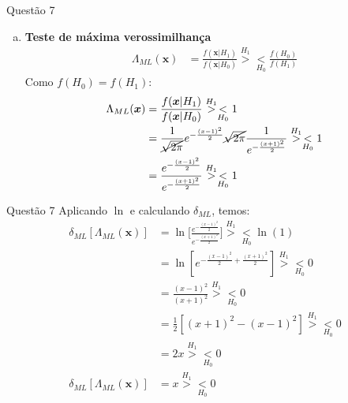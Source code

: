\documentclass{beamer}\usepackage[]{graphicx}\usepackage[]{color}
\begin{document}
		\begin{frame}{Questão 7}
			\begin{enumerate}[a)]
				\item \textbf{Teste de máxima verossimilhança}\\
					\begin{align*}
						\Lambda_{ML}(\boldsymbol{x}) &= \frac{f(\boldsymbol{x}|H_{1})}{f(\boldsymbol{x}|H_{0})} \overset{H_{1}}{>} \underset{H_{0}}{<} \frac{f(H_{0})}{f(H_{1})}
					\end{align*}
					Como $f(H_{0}) = f(H_{1})$:
					\begin{align*}
						\Lambda_{ML}(\boldsymbol{x}) &= \frac{f(\boldsymbol{x}|H_{1})}{f(\boldsymbol{x}|H_{0})} \overset{H_{1}}{>} \underset{H_{0}}{<} 1\\
						&=\frac{1}{\cancel{\sqrt{2\pi}}}e^{-\frac{(x-1)^{2}}{2}} \cancel{\sqrt{2\pi}} \frac{1}{e^{-\frac{(x+1)^{2}}{2}}}\overset{H_{1}}{>} \underset{H_{0}}{<} 1\\
						&= \frac{e^{-\frac{(x-1)^{2}}{2}}}{e^{-\frac{(x+1)^{2}}{2}}}\overset{H_{1}}{>} \underset{H_{0}}{<} 1
					\end{align*}
			\end{enumerate}
		\end{frame}
	
		\begin{frame}{Questão 7}
			Aplicando $\ln$ e calculando $\delta_{ML}$, temos:
			\begin{align*}
				\delta_{ML}[\Lambda_{ML}(\boldsymbol{x})] &= \ln \Bigg[ \frac{e^{-\frac{(x-1)^{2}}{2}}}{e^{-\frac{(x+1)^{2}}{2}}} \Bigg] \overset{H_{1}}{>} \underset{H_{0}}{<} \ln(1)\\
				&= \ln[ e^{-\frac{(x-1)^{2}}{2}+{\frac{(x+1)^{2}}{2}}}]\overset{H_{1}}{>} \underset{H_{0}}{<} 0\\
				&= \frac{(x-1)^{2}}{(x+1)^{2}}\overset{H_{1}}{>} \underset{H_{0}}{<} 0\\
				&= \frac{1}{2}[(x+1)^{2} - (x-1)^2]\overset{H_{1}}{>} \underset{H_{0}}{<} 0\\
				&= 2x \overset{H_{1}}{>} \underset{H_{0}}{<} 0\\
				\delta_{ML}[\Lambda_{ML}(\boldsymbol{x})]&=x \overset{H_{1}}{>} \underset{H_{0}}{<} 0
			\end{align*}
		\end{frame}
	
\end{document}

